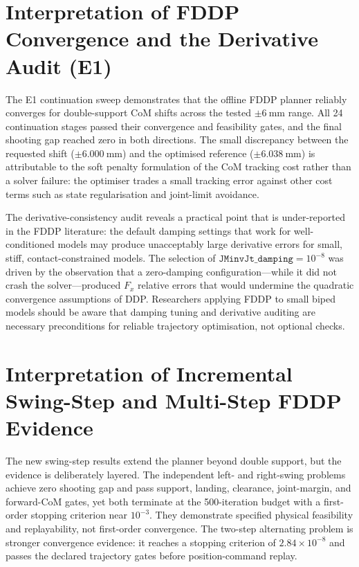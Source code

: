\documentclass[12pt,a4paper]{report}
\begin{document}
\section{Interpretation of FDDP Convergence and the Derivative Audit (E1)}
 
The E1 continuation sweep demonstrates that the offline FDDP planner reliably converges for double-support CoM shifts across the tested $\pm\SI{6}{\milli\metre}$ range. All 24 continuation stages passed their convergence and feasibility gates, and the final shooting gap reached zero in both directions. The small discrepancy between the requested shift ($\pm\SI{6.000}{\milli\metre}$) and the optimised reference ($\pm\SI{6.038}{\milli\metre}$) is attributable to the soft penalty formulation of the CoM tracking cost rather than a solver failure: the optimiser trades a small tracking error against other cost terms such as state regularisation and joint-limit avoidance.
 
The derivative-consistency audit reveals a practical point that is under-reported in the FDDP literature: the default damping settings that work for well-conditioned models may produce unacceptably large derivative errors for small, stiff, contact-constrained models. The selection of $\texttt{JMinvJt\_damping}=10^{-8}$ was driven by the observation that a zero-damping configuration---while it did not crash the solver---produced $F_x$ relative errors that would undermine the quadratic convergence assumptions of DDP. Researchers applying FDDP to small biped models should be aware that damping tuning and derivative auditing are necessary preconditions for reliable trajectory optimisation, not optional checks.

\section{Interpretation of Incremental Swing-Step and Multi-Step FDDP Evidence}

The new swing-step results extend the planner beyond double support, but the evidence is deliberately layered. The independent left- and right-swing problems achieve zero shooting gap and pass support, landing, clearance, joint-margin, and forward-CoM gates, yet both terminate at the 500-iteration budget with a first-order stopping criterion near $10^{-3}$. They demonstrate specified physical feasibility and replayability, not first-order convergence. The two-step alternating problem is stronger convergence evidence: it reaches a stopping criterion of $2.84\times10^{-8}$ and passes the declared trajectory gates before position-command replay.
\end{document}
